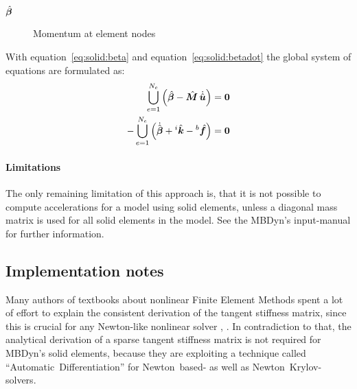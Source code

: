 \begin{description}
\item[$\hat{\bm{\beta}}$] Momentum at element nodes
\end{description}

With equation~\ref{eq:solid:beta} and equation~\ref{eq:solid:betadot} the global system of equations are formulated as:
\begin{eqnarray}
\bigcup_{e=1}^{N_e} \left(\hat{\bm{\beta}} - \hat{\bm{M}} \, \dot{\hat{\bm{u}}}\right) = \bm{0} \\
-\bigcup_{e=1}^{N_e} \left(\dot{\hat{\bm{\beta}}} + {^i}\hat{\bm{k}} - {^b}\hat{\bm{f}} \right) = \bm{0}
\end{eqnarray}

\paragraph{Limitations}
The only remaining limitation of this approach is, that it is not possible to compute accelerations
for a model using solid elements, unless a diagonal mass matrix is used for all solid elements in the model.
See the MBDyn's input-manual for further information.

\subsection{Implementation notes}
Many authors of textbooks about nonlinear Finite Element Methods spent
a lot of effort to explain the consistent derivation of the tangent stiffness matrix,
since this is crucial for any Newton-like nonlinear solver \cite{WALLRAPP1998}, \cite{BATHE2016}.
In contradiction to that, the analytical derivation of a sparse tangent stiffness matrix is not required for MBDyn's solid elements,
because they are exploiting a technique called ``Automatic~Differentiation'' for Newton~based- as well as Newton~Krylov-solvers.
